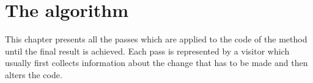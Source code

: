 \chapter{The algorithm}

This chapter presents all the passes which are applied to the code of the method until the final result is achieved.
Each pass is represented by a visitor which usually first collects information about the change that has to be made and
then alters the code.













